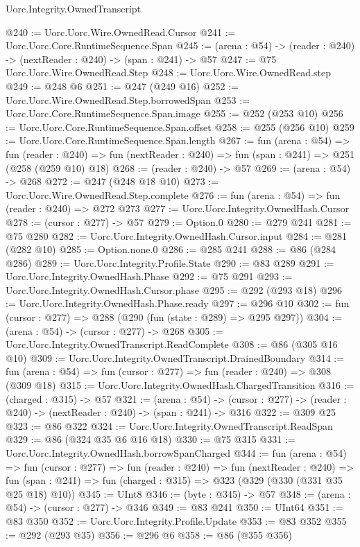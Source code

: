 \begin{lexlean}{Uorc.Integrity.OwnedTranscript}
\begin{coremodule}
@240 := Uorc.Uorc.Wire.OwnedRead.Cursor
@241 := Uorc.Uorc.Core.RuntimeSequence.Span
@245 := (arena : @54) -> (reader : @240) -> (nextReader : @240) -> (span : @241) -> @57
@247 := @75 Uorc.Uorc.Wire.OwnedRead.Step
@248 := Uorc.Uorc.Wire.OwnedRead.step
@249 := @248 @6
@251 := @247 (@249 @16)
@252 := Uorc.Uorc.Wire.OwnedRead.Step.borrowedSpan
@253 := Uorc.Uorc.Core.RuntimeSequence.Span.image
@255 := @252 (@253 @10)
@256 := Uorc.Uorc.Core.RuntimeSequence.Span.offset
@258 := @255 (@256 @10)
@259 := Uorc.Uorc.Core.RuntimeSequence.Span.length
@267 := fun (arena : @54) =>
  fun (reader : @240) => fun (nextReader : @240) => fun (span : @241) => @251 (@258 (@259 @10) @18)
@268 := (reader : @240) -> @57
@269 := (arena : @54) -> @268
@272 := @247 (@248 @18 @10)
@273 := Uorc.Uorc.Wire.OwnedRead.Step.complete
@276 := fun (arena : @54) => fun (reader : @240) => @272 @273
@277 := Uorc.Uorc.Integrity.OwnedHash.Cursor
@278 := (cursor : @277) -> @57
@279 := Option.{0}
@280 := @279 @241
@281 := @75 @280
@282 := Uorc.Uorc.Integrity.OwnedHash.Cursor.input
@284 := @281 (@282 @10)
@285 := Option.none.{0}
@286 := @285 @241
@288 := @86 (@284 @286)
@289 := Uorc.Uorc.Integrity.Profile.State
@290 := @83 @289
@291 := Uorc.Uorc.Integrity.OwnedHash.Phase
@292 := @75 @291
@293 := Uorc.Uorc.Integrity.OwnedHash.Cursor.phase
@295 := @292 (@293 @18)
@296 := Uorc.Uorc.Integrity.OwnedHash.Phase.ready
@297 := @296 @10
@302 := fun (cursor : @277) => @288 (@290 (fun (state : @289) => @295 @297))
@304 := (arena : @54) -> (cursor : @277) -> @268
@305 := Uorc.Uorc.Integrity.OwnedTranscript.ReadComplete
@308 := @86 (@305 @16 @10)
@309 := Uorc.Uorc.Integrity.OwnedTranscript.DrainedBoundary
@314 := fun (arena : @54) => fun (cursor : @277) => fun (reader : @240) => @308 (@309 @18)
@315 := Uorc.Uorc.Integrity.OwnedHash.ChargedTransition
@316 := (charged : @315) -> @57
@321 := (arena : @54) ->
  (cursor : @277) -> (reader : @240) -> (nextReader : @240) -> (span : @241) -> @316
@322 := @309 @25
@323 := @86 @322
@324 := Uorc.Uorc.Integrity.OwnedTranscript.ReadSpan
@329 := @86 (@324 @35 @6 @16 @18)
@330 := @75 @315
@331 := Uorc.Uorc.Integrity.OwnedHash.borrowSpanCharged
@344 := fun (arena : @54) =>
  fun (cursor : @277) =>
  fun (reader : @240) =>
  fun (nextReader : @240) =>
  fun (span : @241) => fun (charged : @315) => @323 (@329 (@330 (@331 @35 @25 @18) @10))
@345 := UInt8
@346 := (byte : @345) -> @57
@348 := (arena : @54) -> (cursor : @277) -> @346
@349 := @83 @241
@350 := UInt64
@351 := @83 @350
@352 := Uorc.Uorc.Integrity.Profile.Update
@353 := @83 @352
@355 := @292 (@293 @35)
@356 := @296 @6
@358 := @86 (@355 @356)

\end{coremodule}
\end{lexlean}
